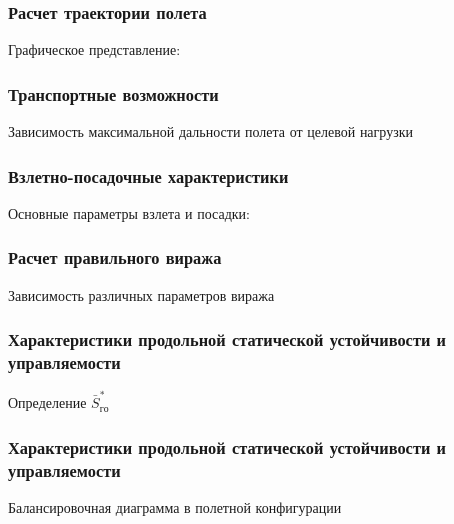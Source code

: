 \documentclass{beamer}
\begin{document}
\begin{frame}[t]
    \frametitle{Расчет траектории полета}
    \begin{center}
        Графическое представление:
        \resizebox{.70\linewidth}{!}{}
    \end{center}
\end{frame}

\begin{frame}[t]
    \frametitle{Транспортные возможности}
    \begin{center}
        Зависимость максимальной дальности полета от целевой нагрузки

        \resizebox{.70\linewidth}{!}{}
    \end{center}
\end{frame}

\begin{frame}[t]
    \frametitle{Взлетно-посадочные характеристики}
    \vfill
    \begin{center}
        Основные параметры взлета и посадки:
        
    \end{center}
    \vfill
\end{frame}

\begin{frame}[t]
    \frametitle{Расчет правильного виража}
    \begin{center}
        Зависимость различных параметров виража
        \resizebox{.70\linewidth}{!}{}
    \end{center}
\end{frame}

\begin{frame}[t]
    \frametitle{Характеристики продольной статической устойчивости и управляемости}
   \begin{center}
       Определение $\bar{S}_{го}^*$ 

       \resizebox{.70\linewidth}{!}{}
   \end{center} 
\end{frame}

\begin{frame}[t]
    \frametitle{Характеристики продольной статической устойчивости и управляемости}
    \begin{center}
        Балансировочная диаграмма в полетной конфигурации 
        \resizebox{.70\linewidth}{!}{}
    \end{center}
\end{frame}
\end{document}
